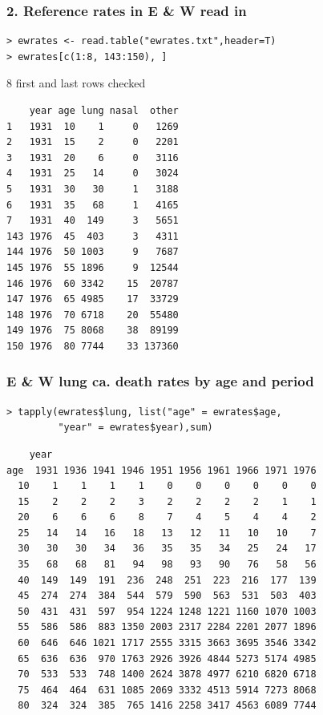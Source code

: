 \documentclass[handout,12pt]{beamer}
\begin{document}
\begin{frame}[fragile]
 \frametitle{2. Reference rates in E \& W read in}
{\small
\renewcommand{\baselinestretch}{0.9}
\begin{verbatim}
> ewrates <- read.table("ewrates.txt",header=T)
> ewrates[c(1:8, 143:150), ]  
\end{verbatim}
\renewcommand{\baselinestretch}{1.0} 
}
8 first and last rows checked
{\scriptsize
\renewcommand{\baselinestretch}{0.9}
\begin{verbatim}
    year age lung nasal  other
1   1931  10    1     0   1269
2   1931  15    2     0   2201
3   1931  20    6     0   3116
4   1931  25   14     0   3024
5   1931  30   30     1   3188
6   1931  35   68     1   4165
7   1931  40  149     3   5651
143 1976  45  403     3   4311
144 1976  50 1003     9   7687
145 1976  55 1896     9  12544
146 1976  60 3342    15  20787
147 1976  65 4985    17  33729
148 1976  70 6718    20  55480
149 1976  75 8068    38  89199
150 1976  80 7744    33 137360

\end{verbatim}  
\renewcommand{\baselinestretch}{1.0} 
}

\end{frame}

\begin{frame}[fragile]
\frametitle{E \& W lung ca. death rates by age and period}
{\small
\renewcommand{\baselinestretch}{0.9}
\begin{verbatim} 
> tapply(ewrates$lung, list("age" = ewrates$age,
         "year" = ewrates$year),sum)
\end{verbatim}
\renewcommand{\baselinestretch}{1.0} 
}
{\scriptsize
\renewcommand{\baselinestretch}{0.9}
\begin{verbatim}
    year
age  1931 1936 1941 1946 1951 1956 1961 1966 1971 1976
  10    1    1    1    1    0    0    0    0    0    0
  15    2    2    2    3    2    2    2    2    1    1
  20    6    6    6    8    7    4    5    4    4    2
  25   14   14   16   18   13   12   11   10   10    7
  30   30   30   34   36   35   35   34   25   24   17
  35   68   68   81   94   98   93   90   76   58   56
  40  149  149  191  236  248  251  223  216  177  139
  45  274  274  384  544  579  590  563  531  503  403
  50  431  431  597  954 1224 1248 1221 1160 1070 1003
  55  586  586  883 1350 2003 2317 2284 2201 2077 1896
  60  646  646 1021 1717 2555 3315 3663 3695 3546 3342
  65  636  636  970 1763 2926 3926 4844 5273 5174 4985
  70  533  533  748 1400 2624 3878 4977 6210 6820 6718
  75  464  464  631 1085 2069 3332 4513 5914 7273 8068
  80  324  324  385  765 1416 2258 3417 4563 6089 7744
\end{verbatim}  
\renewcommand{\baselinestretch}{1.0} 
}

\end{frame}
\end{document}
